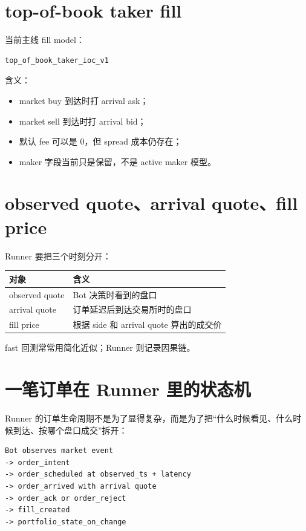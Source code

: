 \section{top-of-book taker fill}

当前主线 fill model：

\begin{lstlisting}
top_of_book_taker_ioc_v1
\end{lstlisting}

含义：

\begin{itemize}[leftmargin=2em]
  \item market buy 到达时打 arrival ask；
  \item market sell 到达时打 arrival bid；
  \item 默认 fee 可以是 0，但 spread 成本仍存在；
  \item maker 字段当前只是保留，不是 active maker 模型。
\end{itemize}

\section{observed quote、arrival quote、fill price}

Runner 要把三个时刻分开：

\begin{longtable}{p{}p{}}
\toprule
对象 & 含义 \\
\midrule
observed quote & Bot 决策时看到的盘口 \\
arrival quote & 订单延迟后到达交易所时的盘口 \\
fill price & 根据 side 和 arrival quote 算出的成交价 \\
\bottomrule
\end{longtable}

fast 回测常常用简化近似；Runner 则记录因果链。

\section{一笔订单在 Runner 里的状态机}

Runner 的订单生命周期不是为了显得复杂，而是为了把“什么时候看见、什么时候到达、按哪个盘口成交”拆开：

\begin{lstlisting}
Bot observes market event
-> order_intent
-> order_scheduled at observed_ts + latency
-> order_arrived with arrival quote
-> order_ack or order_reject
-> fill_created
-> portfolio_state_on_change
\end{lstlisting}

